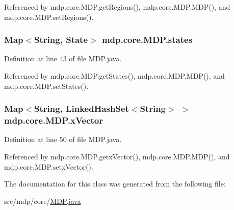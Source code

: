 Referenced by mdp.\+core.\+M\+D\+P.\+get\+Regions(), mdp.\+core.\+M\+D\+P.\+M\+D\+P(), and mdp.\+core.\+M\+D\+P.\+set\+Regions().

\hypertarget{classmdp_1_1core_1_1_m_d_p_a62bf7674d88162db7d00cfd82603b24f}{}
\subsubsection[{states}]{\setlength{\rightskip}{0pt plus 5cm}Map$<$String, {\bf State}$>$ mdp.\+core.\+M\+D\+P.\+states\hspace{0.3cm}{\ttfamily [private]}}\label{classmdp_1_1core_1_1_m_d_p_a62bf7674d88162db7d00cfd82603b24f}


Definition at line 43 of file M\+D\+P.\+java.



Referenced by mdp.\+core.\+M\+D\+P.\+get\+States(), mdp.\+core.\+M\+D\+P.\+M\+D\+P(), and mdp.\+core.\+M\+D\+P.\+set\+States().

\hypertarget{classmdp_1_1core_1_1_m_d_p_a073e9c6d6e349ae034c3cf220d754324}{}
\subsubsection[{x\+Vector}]{\setlength{\rightskip}{0pt plus 5cm}Map$<$String, Linked\+Hash\+Set$<$String$>$ $>$ mdp.\+core.\+M\+D\+P.\+x\+Vector\hspace{0.3cm}{\ttfamily [private]}}\label{classmdp_1_1core_1_1_m_d_p_a073e9c6d6e349ae034c3cf220d754324}


Definition at line 50 of file M\+D\+P.\+java.



Referenced by mdp.\+core.\+M\+D\+P.\+getx\+Vector(), mdp.\+core.\+M\+D\+P.\+M\+D\+P(), and mdp.\+core.\+M\+D\+P.\+setx\+Vector().



The documentation for this class was generated from the following file\+:\begin{DoxyCompactItemize}
\item 
src/mdp/core/\hyperlink{_m_d_p_8java}{M\+D\+P.\+java}\end{DoxyCompactItemize}
